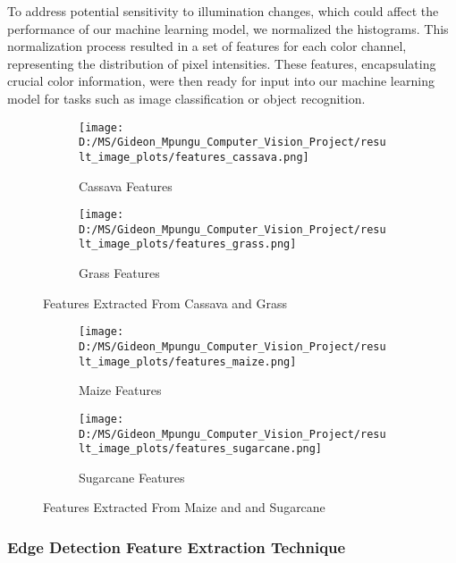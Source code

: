 \documentclass[10pt,twocolumn,letterpaper]{article}
\begin{document}
To address potential sensitivity to illumination changes, which could affect the performance of our machine learning model, we normalized the histograms. This normalization process resulted in a set of features for each color channel, representing the distribution of pixel intensities. These features, encapsulating crucial color information, were then ready for input into our machine learning model for tasks such as image classification or object recognition.


\begin{figure*}[ht]
    \centering
    
    \begin{subfigure}{0.45\textwidth}
        \texttt{[image: D:/MS/Gideon\_Mpungu\_Computer\_Vision\_Project/result\_image\_plots/features\_cassava.png]}
        \caption{Cassava Features}
        \label{fig:cassava}
    \end{subfigure}
    \hfill
    \begin{subfigure}{0.45\textwidth}
        \texttt{[image: D:/MS/Gideon\_Mpungu\_Computer\_Vision\_Project/result\_image\_plots/features\_grass.png]}
        \caption{Grass Features}
        \label{fig:grass}
    \end{subfigure}
    
    \caption{Features Extracted From Cassava and Grass}
    \label{fig:features}
\end{figure*}

\begin{figure*}[ht]
    \centering
    
    \begin{subfigure}{0.45\textwidth}
        \texttt{[image: D:/MS/Gideon\_Mpungu\_Computer\_Vision\_Project/result\_image\_plots/features\_maize.png]}
        \caption{Maize Features}
        \label{fig:maize}
    \end{subfigure}
    \hfill
    \begin{subfigure}{0.45\textwidth}
        \texttt{[image: D:/MS/Gideon\_Mpungu\_Computer\_Vision\_Project/result\_image\_plots/features\_sugarcane.png]}
        \caption{Sugarcane Features}
        \label{fig:sugarcane}
    \end{subfigure}
    
    \caption{Features Extracted From Maize and and Sugarcane}
    \label{fig:features}
\end{figure*}

\subsubsection{Edge Detection Feature Extraction Technique}
\end{document}
